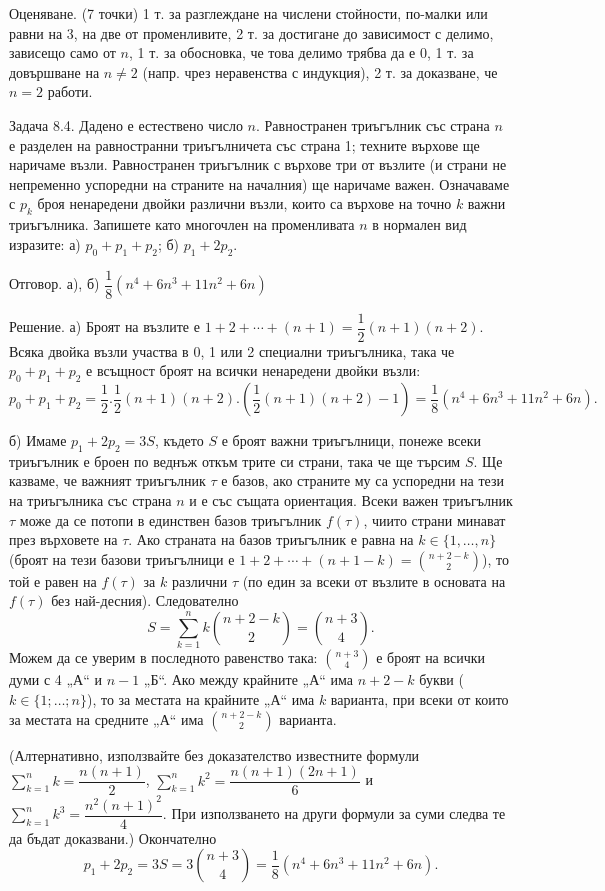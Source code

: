 Оценяване. (7 точки) 1 т. за разглеждане на числени стойности, по-малки или равни на 3, на две от променливите, 2 т. за достигане до зависимост с делимо, зависещо само от $n$, 1 т. за обосновка, че това делимо трябва да е 0, 1 т. за довършване на $n\neq2$ (напр. чрез неравенства с индукция), 2 т. за доказване, че $n=2$ работи.

Задача 8.4. Дадено е естествено число $n$. Равностранен триъгълник със страна $n$ е разделен на равностранни триъгълничета със страна 1; техните върхове ще наричаме възли. Равностранен триъгълник с върхове три от възлите (и страни не непременно успоредни на страните на началния) ще наричаме важен. Означаваме с $p_k$ броя ненаредени двойки различни възли, които са върхове на точно $k$ важни триъгълника. Запишете като многочлен на променливата $n$ в нормален вид изразите: а) $p_0+p_1+p_2$; б) $p_1+2p_2$.

Отговор. а), б) $\dfrac18(n^4+6n^3+11n^2+6n)$

Решение. а) Броят на възлите е $1+2+\cdots+(n+1)=\dfrac12(n+1)(n+2)$. Всяка двойка възли участва в 0, 1 или 2 специални триъгълника, така че $p_0+p_1+p_2$ е всъщност броят на всички ненаредени двойки възли:
$$
p_0+p_1+p_2=\frac12.\frac12(n+1)(n+2).\left(\frac12(n+1)(n+2)-1\right)=\frac18(n^4+6n^3+11n^2+6n).
$$

б) Имаме $p_1+2p_2=3S$, където $S$ е броят важни триъгълници, понеже всеки триъгълник е броен по веднъж откъм трите си страни, така че ще търсим $S$. Ще казваме, че важният триъгълник $\tau$ е базов, ако страните му са успоредни на тези на триъгълника със страна $n$ и е със същата ориентация. Всеки важен триъгълник $\tau$ може да се потопи в единствен базов триъгълник $f(\tau)$, чиито страни минават през върховете на $\tau$. Ако страната на базов триъгълник е равна на $k\in\{1,\ldots,n\}$ (броят на тези базови триъгълници е $1+2+\cdots+(n+1-k)=\binom{n+2-k}{2}$), то той е равен на $f(\tau)$ за $k$ различни $\tau$ (по един за всеки от възлите в основата на $f(\tau)$ без най-десния). Следователно
$$
S=\sum_{k=1}^n k\binom{n+2-k}{2}=\binom{n+3}{4}.
$$
Можем да се уверим в последното равенство така: $\binom{n+3}{4}$ е броят на всички думи с 4 „А“ и $n-1$ „Б“. Ако между крайните „А“ има $n+2-k$ букви ($k\in\{1;\ldots;n\}$), то за местата на крайните „А“ има $k$ варианта, при всеки от които за местата на средните „А“ има $\binom{n+2-k}{2}$ варианта.

(Алтернативно, използвайте без доказателство известните формули $\sum_{k=1}^n k=\dfrac{n(n+1)}2$, $\sum_{k=1}^n k^2=\dfrac{n(n+1)(2n+1)}6$ и $\sum_{k=1}^n k^3=\dfrac{n^2(n+1)^2}4$. При използването на други формули за суми следва те да бъдат доказвани.) Окончателно
$$
p_1+2p_2=3S=3\binom{n+3}{4}=\frac18(n^4+6n^3+11n^2+6n).
$$

